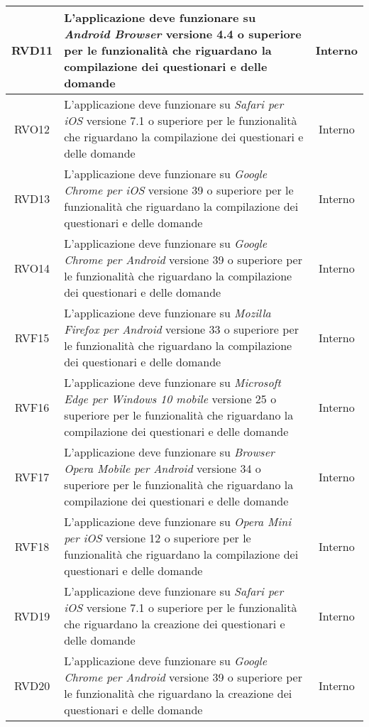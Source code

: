 \begin{longtable}{|c|>{\centering}m{7cm}|c|}
		\\ \hline
		\hypertarget{RVD11}{RVD11} & L’applicazione deve funzionare su \textit{Android Browser\ped{G}} versione 4.4 o superiore per le funzionalità che riguardano la compilazione dei questionari e delle domande & Interno
		\\ \hline
		\hypertarget{RVO12}{RVO12} & L’applicazione deve funzionare su \textit{Safari per iOS\ped{G}} versione 7.1 o superiore per le funzionalità che riguardano la compilazione dei questionari e delle domande & Interno
		\\ \hline
		\hypertarget{RVD13}{RVD13} & L’applicazione deve funzionare su \textit{Google Chrome per iOS\ped{G}} versione 39 o superiore per le funzionalità che riguardano la compilazione dei questionari e delle domande & Interno
		\\ \hline
		\hypertarget{RVO14}{RVO14} & L’applicazione deve funzionare su \textit{Google Chrome per Android\ped{G}} versione 39 o superiore per le funzionalità che riguardano la compilazione dei questionari e delle domande & Interno
		\\ \hline
		\hypertarget{RVF15}{RVF15} & L’applicazione deve funzionare su \textit{Mozilla Firefox per Android\ped{G}} versione 33 o superiore per le funzionalità che riguardano la compilazione dei questionari e delle domande & Interno
		\\ \hline
		\hypertarget{RVF16}{RVF16} & L’applicazione deve funzionare su \textit{Microsoft Edge per Windows 10 mobile\ped{G}} versione 25 o superiore per le funzionalità che riguardano la compilazione dei questionari e delle domande & Interno
		\\ \hline
		\hypertarget{RVF17}{RVF17} & L’applicazione deve funzionare su \textit{Browser Opera Mobile per Android\ped{G}} versione 34 o superiore per le funzionalità che riguardano la compilazione dei questionari e delle domande & Interno
		\\ \hline
		\hypertarget{RVF18}{RVF18} & L’applicazione deve funzionare su \textit{Opera Mini per iOS\ped{G}} versione 12 o superiore per le funzionalità che riguardano la compilazione dei questionari e delle domande & Interno
		\\ \hline
		\hypertarget{RVD19}{RVD19} & L’applicazione deve funzionare su \textit{Safari per iOS\ped{G}} versione 7.1 o superiore per le funzionalità che riguardano la creazione dei questionari e delle domande & Interno
		\\ \hline
		\hypertarget{RVD20}{RVD20} & L’applicazione deve funzionare su \textit{Google Chrome per Android\ped{G}} versione 39 o superiore per le funzionalità che riguardano la creazione dei questionari e delle domande & Interno

\end{longtable}
